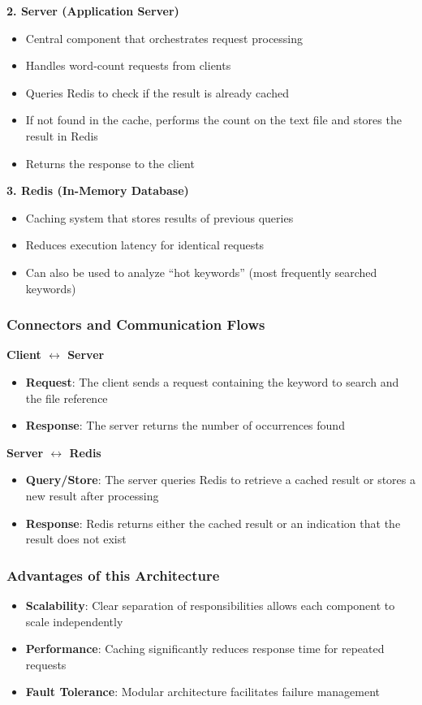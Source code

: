 \documentclass[conference]{IEEEtran}
\begin{document}
\textbf{2. Server (Application Server)}
\begin{itemize}
    \item Central component that orchestrates request processing
    \item Handles word-count requests from clients
    \item Queries Redis to check if the result is already cached
    \item If not found in the cache, performs the count on the text file and stores the result in Redis
    \item Returns the response to the client
\end{itemize}

\textbf{3. Redis (In-Memory Database)}
\begin{itemize}
    \item Caching system that stores results of previous queries
    \item Reduces execution latency for identical requests
    \item Can also be used to analyze ``hot keywords'' (most frequently searched keywords)
\end{itemize}

\subsubsection*{Connectors and Communication Flows}

\textbf{Client $\leftrightarrow$ Server}
\begin{itemize}
    \item \textbf{Request}: The client sends a request containing the keyword to search and the file reference
    \item \textbf{Response}: The server returns the number of occurrences found
\end{itemize}

\textbf{Server $\leftrightarrow$ Redis}
\begin{itemize}
    \item \textbf{Query/Store}: The server queries Redis to retrieve a cached result or stores a new result after processing
    \item \textbf{Response}: Redis returns either the cached result or an indication that the result does not exist
\end{itemize}

\subsubsection*{Advantages of this Architecture}
\begin{itemize}
    \item \textbf{Scalability}: Clear separation of responsibilities allows each component to scale independently
    \item \textbf{Performance}: Caching significantly reduces response time for repeated requests
    \item \textbf{Fault Tolerance}: Modular architecture facilitates failure management
\end{itemize}
\end{document}
